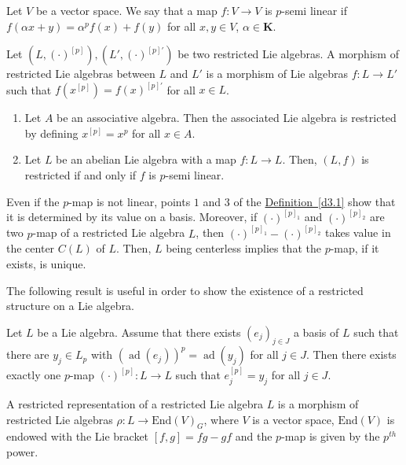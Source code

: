 \documentclass[11pt, twoside]{article}
\DeclareMathOperator{\ad}{ad}
\begin{document}
\begin{defi}
    Let $V$ be a vector space. We say that a map $f:V\to V $ is $p$-semi linear if $f(\alpha x+ y)= \alpha^p f(x)+ f(y) $ for all $x,y\in V$, $\alpha\in \mathbf{K}$.
\end{defi}

\begin{defi}
    Let $(L,(\cdot)^{[p]}), (L',(\cdot)^{[p]'})$ be two restricted Lie algebras. A morphism of restricted Lie algebras between $L$ and $L'$ is a morphism of Lie algebras $f:L\to L' $ such that $f(x^{[p]})=f(x)^{[p]'} $ for all $x\in L$.
\end{defi}

\begin{ex}
    \begin{enumerate}
        \item Let $A$ be an associative algebra. Then the associated Lie algebra is restricted by defining $x^{[p]}=x^p $ for all $x\in A$.
        \item Let $L$ be an abelian Lie algebra with a map $f:L\to L $. Then, $(L,f)$ is restricted if and only if $f $ is $p$-semi linear.
    \end{enumerate}
\end{ex}

\begin{rmq}
    Even if the $p$-map is not linear, points $1$ and $3$ of the \hyperref[d3.1]{Definition~\ref*{d3.1}} show that it is determined by its value on a basis. Moreover, if $(\cdot)^{[p]_1} $ and $(\cdot)^{[p]_2} $ are two $p$-map of a restricted Lie algebra $L$, then $(\cdot)^{[p]_1}-(\cdot)^{[p]_2} $ takes value in the center $C(L) $ of $L$. Then, $L$ being centerless implies that the $p$-map, if it exists, is unique.
\end{rmq}

The following result is useful in order to show the existence of a restricted structure on a Lie algebra.

\begin{thm}[Jacobson]\label{thm3.4}
    Let $L$ be a Lie algebra. Assume that there exists $(e_{j})_{j\in J} $ a basis of $L$ such that there are $y_{j}\in L_{p} $ with $(\ad (e_{j}))^p= \ad (y_{j})$ for all $j\in J $. Then there exists exactly one $p$-map $(\cdot)^{[p]}:L\to L $ such that $e_{j}^{[p]}=y_{j} $ for all $j\in J$. 
\end{thm}

\begin{defi}
    A restricted representation of a restricted Lie algebra $L$ is a morphism of restricted Lie algebras $\rho:L\to \mathrm{End}(V)_G$, where $V$ is a vector space, $\mathrm{End}(V)$ is endowed with the Lie bracket $[f,g]=fg-gf $ and the $p$-map is given by the $p^{th}$ power.
\end{defi}
\end{document}
